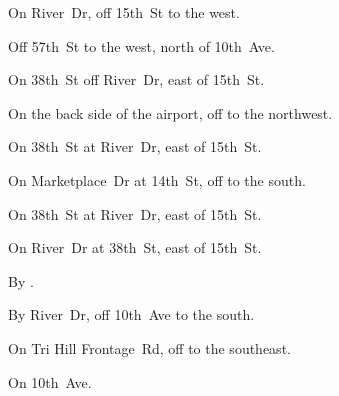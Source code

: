 

\begin{LocationList}

On River~Dr, off  15th~St to the west.

Off 57th~St to the west, north of   10th~Ave.

\Location{\GarageHQ \Garage}
On 38th~St off River~Dr, east of  15th~St.

On the back side of the airport, off   to the northwest.

On 38th~St at River~Dr, east of  15th~St.

On Marketplace~Dr at 14th~St, off   to the south.

\Location{\RecruitmentAgency \Recruitment}
On 38th~St at River~Dr, east of  15th~St.

On River~Dr at 38th~St, east of  15th~St.

\Location{\TruckStop \Gas \Rest}
By  .

By River~Dr, off  10th~Ave to the south.

On Tri Hill Frontage~Rd, off   to the southeast.

On   10th~Ave.

\end{LocationList}
